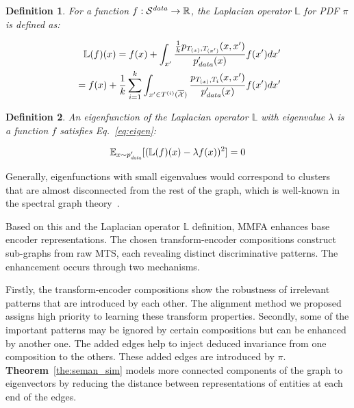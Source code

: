 \documentclass{article}
\newtheorem{definition}{Definition}
\begin{document}
\begin{definition}\label{def:laplace}
For a function $f: \mathcal{S}^{\text{\textit{data}}} \to \mathbb{R}$, the \emph{Laplacian operator} $\mathbb{L}$ for PDF $\pi$ is defined as:

\begin{equation}\label{eq:laplacian}
    \begin{aligned}
\mathbb{L}(f)(x)  = f(x) + \int_{x^\prime} \frac {\frac 1 k p_{T_{(x)}, T_{(x^\prime)}}(x, x^\prime)} {p_{\text{\textit{data}}}^\prime(x)} f(x^\prime) dx^\prime \\
  \  = f(x) + \frac 1 k \sum_{i=1}^k \int_{x^\prime \in T^{(i)}(\overline{\mathcal{X}})} \frac {p_{T_{(x)}, T_i}(x, x^\prime)} {p_{\text{\textit{data}}}^\prime(x)} f(x^\prime) dx^\prime    
    \end{aligned}
\end{equation}
\end{definition}

\begin{definition}\label{def:lap_eig}
An \emph{eigenfunction} of the Laplacian operator $\mathbb{L}$ with eigenvalue $\lambda$ is a function $f$ satisfies Eq.~\ref{eq:eigen}:

\begin{equation}\label{eq:eigen}
    \mathbb{E}_{x\sim p_{\text{\textit{data}}}^\prime}[(\mathbb{L}(f)(x) - \lambda f(x))^2]=0 
\end{equation}
\end{definition}

Generally, eigenfunctions with small eigenvalues would correspond to clusters that are almost disconnected from the rest of the graph, which is well-known in the spectral graph theory~\cite{trevisan2017lecture}. 

Based on this and the Laplacian operator $\mathbb{L}$ definition, MMFA enhances base encoder representations. The chosen transform-encoder compositions construct sub-graphs from raw MTS, each revealing distinct discriminative patterns. The enhancement occurs through two mechanisms.

Firstly, the transform-encoder compositions show the robustness of irrelevant patterns that are introduced by each other. The alignment method we proposed assigns high priority to learning these transform properties. Secondly, some of the important patterns may be ignored by certain compositions but can be enhanced by another one. The added edges help to inject deduced invariance from one composition to the others. These added edges are introduced by $\pi$. \textbf{Theorem}~\ref{the:seman_sim} models more connected components of the graph to eigenvectors by reducing the distance between representations of entities at each end of the edges.
\end{document}

